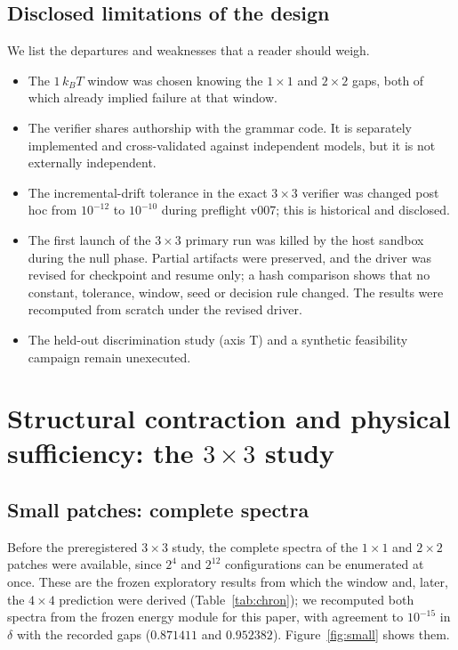 \documentclass[11pt,a4paper]{article}
\theoremstyle{plain}
\theoremstyle{definition}
\theoremstyle{remark}
\newcommand{\kBT}{k_{B}T}
\begin{document}
\subsection{Disclosed limitations of the design}
We list the departures and weaknesses that a reader should weigh.
\begin{itemize}
\item The $1\,\kBT$ window was chosen knowing the $1\times1$ and $2\times2$ gaps, both of which already implied failure at that window.
\item The verifier shares authorship with the grammar code. It is separately implemented and cross-validated against independent models, but it is not externally independent.
\item The incremental-drift tolerance in the exact $3\times3$ verifier was changed post hoc from $10^{-12}$ to $10^{-10}$ during preflight v007; this is historical and disclosed.
\item The first launch of the $3\times3$ primary run was killed by the host sandbox during the null phase. Partial artifacts were preserved, and the driver was revised for checkpoint and resume only; a hash comparison shows that no constant, tolerance, window, seed or decision rule changed. The results were recomputed from scratch under the revised driver.
\item The held-out discrimination study (axis T) and a synthetic feasibility campaign remain unexecuted.
\end{itemize}

\section{Structural contraction and physical sufficiency: the $3\times3$ study}\label{sec:contraction}

\subsection{Small patches: complete spectra}\label{sec:small}
Before the preregistered $3\times3$ study, the complete spectra of the $1\times1$ and $2\times2$ patches were available, since $2^4$ and $2^{12}$ configurations can be enumerated at once. These are the frozen exploratory results from which the window and, later, the $4\times4$ prediction were derived (Table~\ref{tab:chron}); we recomputed both spectra from the frozen energy module for this paper, with agreement to $10^{-15}$ in $\delta$ with the recorded gaps ($0.871411$ and $0.952382$). Figure~\ref{fig:small} shows them.
\end{document}
